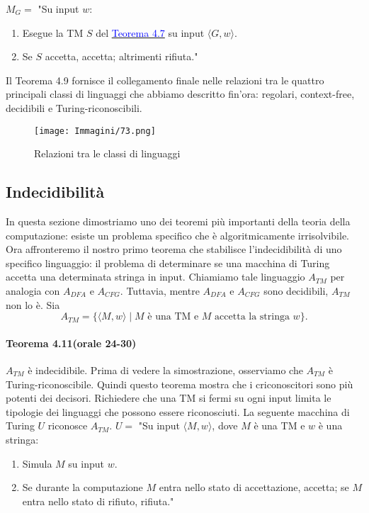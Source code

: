 \documentclass{article}
\begin{document}
$M_G = $ "Su input $w$:
\begin{enumerate}
    \item Esegue la TM $S$ del \hyperref[teorema-4.7]{\textcolor{blue}{Teorema 4.7}} su input $\langle G,w \rangle$.
    \item Se $S$ accetta, accetta; altrimenti rifiuta."
\end{enumerate}
\vspace{1em}
\text{}
\newline
Il Teorema 4.9 fornisce il collegamento finale nelle relazioni tra le quattro principali classi di linguaggi che abbiamo descritto fin'ora: regolari, context-free, decidibili e Turing-riconoscibili.
\begin{figure}[H]
    \centering
    \texttt{[image: Immagini/73.png]}
    \caption{Relazioni tra le classi di linguaggi}
    \label{figura-4.10}
\end{figure}

\subsection{Indecidibilità}
In questa sezione dimostriamo uno dei teoremi più importanti della teoria della computazione:
esiste un problema specifico che è algoritmicamente irrisolvibile.
\vspace{1em}
\text{}
\newline
Ora affronteremo il nostro primo teorema che stabilisce l'indecidibilità di uno specifico linguaggio:
il problema di determinare se una macchina di Turing accetta una determinata stringa in input.
Chiamiamo tale linguaggio $A_{TM}$ per analogia con $A_{DFA}$ e $A_{CFG}$.
Tuttavia, mentre $A_{DFA}$ e $A_{CFG}$ sono decidibili, $A_{TM}$ non lo è. Sia
$$
A_{TM} = \{\langle M,w \rangle \mid M \text{ è una TM e } M \text{ accetta la stringa } w \}.
$$

\paragraph{Teorema 4.11(orale 24-30)}
\label{teorema-4.11}
\text{}
\newline
$A_{TM}$ è indecidibile.
\vspace{1em}
\text{}
\newline
Prima di vedere la simostrazione, osserviamo che $A_{TM}$ è Turing-riconoscibile.
Quindi questo teorema mostra che i criconoscitori sono più potenti dei decisori.
Richiedere che una TM si fermi su ogni input limita le tipologie dei linguaggi che possono essere riconosciuti.
La seguente macchina di Turing $U$ riconosce $A_{TM}$.
\vspace{1em}
\text{}
\newline
$U = $ "Su input $\langle M,w \rangle$, dove $M$ è una TM e $w$ è una stringa:
\begin{enumerate}
    \item Simula $M$ su input $w$.
    \item Se durante la computazione $M$ entra nello stato di accettazione, accetta; se $M$ entra nello stato di rifiuto, rifiuta."
\end{enumerate}
\end{document}
